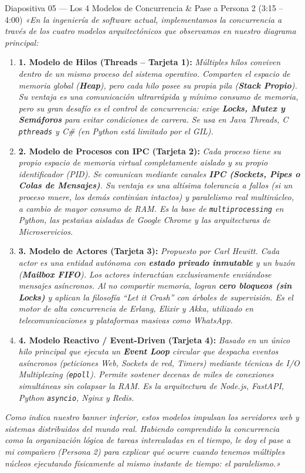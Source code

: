 \documentclass[11pt,a4paper]{article}
\begin{document}
\begin{guionbox}{Diapositiva 05 --- Los 4 Modelos de Concurrencia \& Pase a Persona 2 (3:15 -- 4:00)}
\textit{«En la ingeniería de software actual, implementamos la concurrencia a través de los cuatro modelos arquitectónicos que observamos en nuestro diagrama principal:}

\begin{enumerate}[leftmargin=5mm]
    \item \textbf{1. Modelo de Hilos (Threads -- Tarjeta 1):} \textit{Múltiples hilos conviven dentro de un mismo proceso del sistema operativo. Comparten el espacio de memoria global (\textbf{Heap}), pero cada hilo posee su propia pila (\textbf{Stack Propio}). Su ventaja es una comunicación ultrarrápida y mínimo consumo de memoria, pero su gran desafío es el control de concurrencia: exige \textbf{Locks, Mutex y Semáforos} para evitar condiciones de carrera. Se usa en Java Threads, C \texttt{pthreads} y C\# (en Python está limitado por el GIL).}
    \item \textbf{2. Modelo de Procesos con IPC (Tarjeta 2):} \textit{Cada proceso tiene su propio espacio de memoria virtual completamente aislado y su propio identificador (PID). Se comunican mediante canales \textbf{IPC (Sockets, Pipes o Colas de Mensajes)}. Su ventaja es una altísima tolerancia a fallos (si un proceso muere, los demás continúan intactos) y paralelismo real multinúcleo, a cambio de mayor consumo de RAM. Es la base de \texttt{multiprocessing} en Python, las pestañas aisladas de Google Chrome y las arquitecturas de Microservicios.}
    \item \textbf{3. Modelo de Actores (Tarjeta 3):} \textit{Propuesto por Carl Hewitt. Cada actor es una entidad autónoma con \textbf{estado privado inmutable} y un buzón (\textbf{Mailbox FIFO}). Los actores interactúan exclusivamente enviándose mensajes asíncronos. Al no compartir memoria, logran \textbf{cero bloqueos (sin Locks)} y aplican la filosofía \textit{“Let it Crash”} con árboles de supervisión. Es el motor de alta concurrencia de Erlang, Elixir y Akka, utilizado en telecomunicaciones y plataformas masivas como WhatsApp.}
    \item \textbf{4. Modelo Reactivo / Event-Driven (Tarjeta 4):} \textit{Basado en un único hilo principal que ejecuta un \textbf{Event Loop} circular que despacha eventos asíncronos (peticiones Web, Sockets de red, Timers) mediante técnicas de I/O Multiplexing (\texttt{epoll}). Permite sostener decenas de miles de conexiones simultáneas sin colapsar la RAM. Es la arquitectura de Node.js, FastAPI, Python \texttt{asyncio}, Nginx y Redis.}
\end{enumerate}

\textit{Como indica nuestro banner inferior, estos modelos impulsan los servidores web y sistemas distribuidos del mundo real. Habiendo comprendido la concurrencia como la organización lógica de tareas intercaladas en el tiempo, le doy el pase a mi compañero (Persona 2) para explicar qué ocurre cuando tenemos múltiples núcleos ejecutando físicamente al mismo instante de tiempo: el paralelismo.»}
\end{guionbox}
\end{document}
